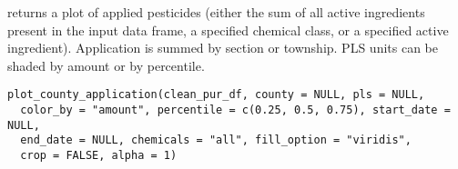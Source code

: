 \documentclass[a4paper]{book}
\begin{document}
%
\begin{Description}\relax
{} returns a plot of applied pesticides (either the
sum of all active ingredients present in the input  data
frame, a specified chemical class, or a specified active ingredient). Application
is summed by section or township. PLS units can be shaded by amount or by
percentile.
\end{Description}
%
\begin{Usage}
\begin{verbatim}
plot_county_application(clean_pur_df, county = NULL, pls = NULL,
  color_by = "amount", percentile = c(0.25, 0.5, 0.75), start_date = NULL,
  end_date = NULL, chemicals = "all", fill_option = "viridis",
  crop = FALSE, alpha = 1)
\end{verbatim}
\end{Usage}
%
\end{document}
